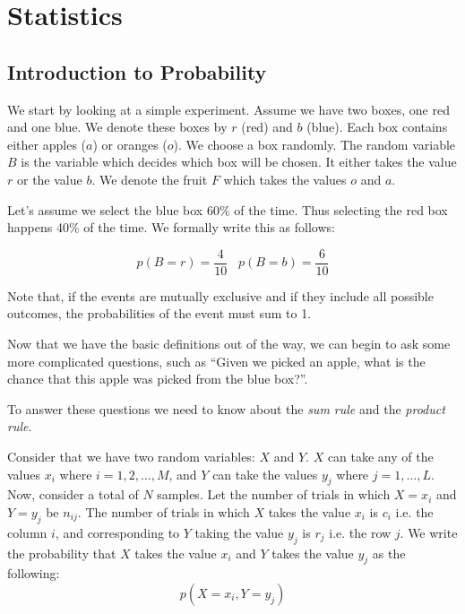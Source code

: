 \chapter{Statistics}

\section{Introduction to Probability}%
\label{sec:label}

We start by looking at a simple experiment. Assume we have two boxes, one red and one blue. We denote these boxes by $r$ (red) and $b$ (blue). Each box contains either apples ($a$) or oranges ($o$). We choose a box randomly. The random variable $B$ is the variable which decides which box will be chosen. It either takes the value $r$ or the value $b$. We denote the fruit $F$ which takes the values $o$ and $a$.

Let's assume we select the blue box 60\% of the time. Thus selecting the red box happens 40\% of the time. We formally write this as follows:

\begin{equation}
	p(B=r) = \frac{4}{10} \;\;\; p(B=b) = \frac{6}{10}
\end{equation}

Note that, if the events are mutually exclusive and if they include all possible outcomes, the probabilities of the event must sum to 1.

Now that we have the basic definitions out of the way, we can begin to ask some more complicated questions, such as ``Given we picked an apple, what is the chance that this apple was picked from the blue box?''.

To answer these questions we need to know about the \textit{sum rule} and the \textit{product rule}.

Consider that we have two random variables: $X$ and $Y$. $X$ can take any of the values $x_{i}$ where $i = 1, 2, \ldots, M$, and $Y$ can take the values $y_{j}$ where $j = 1, \ldots, L$. Now, consider a total of $N$ samples. Let the number of trials in which $X = x_{i}$ and $Y = y_{j}$ be $n_{ij}$. The number of trials in which $X$ takes the value $x_{i}$ is $c_{i}$ i.e. the column $i$, and corresponding to $Y$ taking the value $y_{j}$ is $r_{j}$ i.e. the row $j$. We write the probability that $X$ takes the value $x_{i}$ and $Y$ takes the value $y_{j}$ as the following:
\begin{equation*}
	p(X =  x_{i}, Y = y_{j})
\end{equation*}

